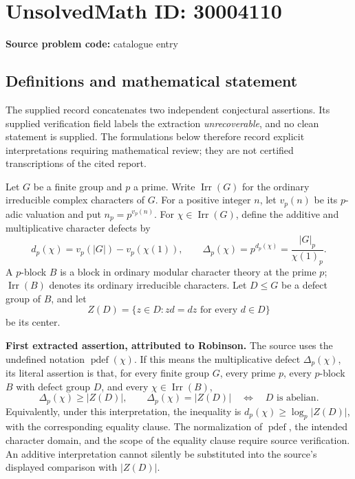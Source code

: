 \documentclass[11pt]{article}
\begin{document}
\section*{UnsolvedMath ID: 30004110}
\textbf{Source problem code:} catalogue entry
\subsection{Definitions and mathematical statement}
The supplied record concatenates two independent conjectural assertions. Its supplied verification field labels the extraction \emph{unrecoverable}, and no clean statement is supplied. The formulations below therefore record explicit interpretations requiring mathematical review; they are not certified transcriptions of the cited report.

Let \(G\) be a finite group and \(p\) a prime. Write \(\operatorname{Irr}(G)\) for the ordinary irreducible complex characters of \(G\). For a positive integer \(n\), let \(v_p(n)\) be its \(p\)-adic valuation and put \(n_p=p^{v_p(n)}\). For \(\chi\in\operatorname{Irr}(G)\), define the additive and multiplicative character defects by
\[
 d_p(\chi)=v_p(|G|)-v_p(\chi(1)),\qquad
 \Delta_p(\chi)=p^{d_p(\chi)}=\frac{|G|_p}{\chi(1)_p}.
\]
A \(p\)-block \(B\) is a block in ordinary modular character theory at the prime \(p\); \(\operatorname{Irr}(B)\) denotes its ordinary irreducible characters. Let \(D\leq G\) be a defect group of \(B\), and let
\[
 Z(D)=\{z\in D:zd=dz\text{ for every }d\in D\}
\]
be its center.

\textbf{First extracted assertion, attributed to Robinson.}
The source uses the undefined notation \(\operatorname{pdef}(\chi)\). If this means the multiplicative defect \(\Delta_p(\chi)\), its literal assertion is that, for every finite group \(G\), every prime \(p\), every \(p\)-block \(B\) with defect group \(D\), and every \(\chi\in\operatorname{Irr}(B)\),
\[
 \Delta_p(\chi)\geq |Z(D)|,
 \qquad
 \Delta_p(\chi)=|Z(D)|
 \quad\Longleftrightarrow\quad
 D\text{ is abelian}.
\]
Equivalently, under this interpretation, the inequality is \(d_p(\chi)\geq\log_p|Z(D)|\), with the corresponding equality clause. The normalization of \(\operatorname{pdef}\), the intended character domain, and the scope of the equality clause require source verification. An additive interpretation cannot silently be substituted into the source's displayed comparison with \(|Z(D)|\).
\end{document}
